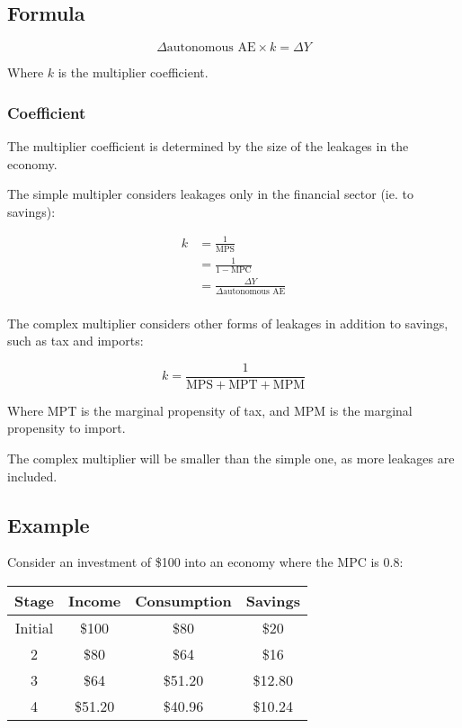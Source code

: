 \documentclass[a4paper,11pt]{report}
\begin{document}
\subsection{Formula}

$$
\Delta \mbox{autonomous AE} \times k = \Delta Y
$$

Where $k$ is the multiplier coefficient.

\subsubsection{Coefficient}

The multiplier coefficient is determined by the size of the leakages in the
economy.

The simple multipler considers leakages only in the financial sector (ie. to
savings):

$$
\begin{aligned}
k & = \frac{1}{\mbox{MPS}} \\
& = \frac{1}{1 - \mbox{MPC}} \\
& = \frac{\Delta Y}{\Delta \mbox{autonomous AE}} \\
\end{aligned}
$$

The complex multiplier considers other forms of leakages in addition to savings,
such as tax and imports:

$$
k = \frac{1}{\mbox{MPS} + \mbox{MPT} + \mbox{MPM}}
$$

Where MPT is the marginal propensity of tax, and MPM is the marginal propensity
to import.

The complex multiplier will be smaller than the simple one, as more leakages
are included.

\subsection{Example}

Consider an investment of \$100 into an economy where the MPC is 0.8:

\begin{center}
\begin{tabular}{c|c c c}
Stage & Income & Consumption & Savings \\
\hline
Initial & \$100   & \$80    & \$20    \\
2       & \$80    & \$64    & \$16    \\
3       & \$64    & \$51.20 & \$12.80 \\
4       & \$51.20 & \$40.96 & \$10.24 \\
\end{tabular}
\end{center}
\end{document}
